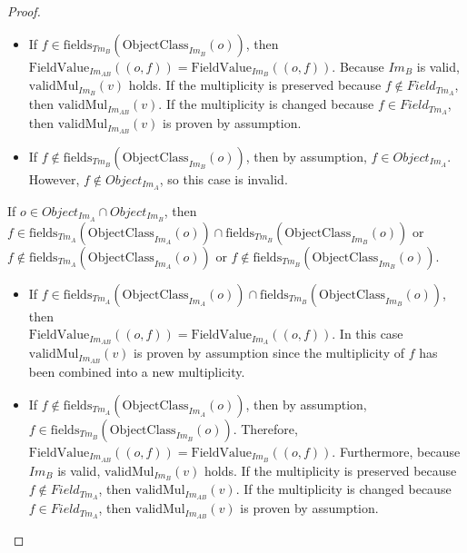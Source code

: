 \begin{proof}
\begin{itemize}
    \begin{itemize}
        \item If $f \in \mathrm{fields}_{Tm_{B}}(\mathrm{ObjectClass}_{Im_{B}}(o))$, then $\mathrm{FieldValue}_{Im_{AB}}(( o, f )) = \mathrm{FieldValue}_{Im_{B}}(( o, f ))$. Because $Im_{B}$ is valid, $\mathrm{validMul}_{Im_{B}}(v)$ holds. If the multiplicity is preserved because $f \not\in Field_{Tm_A}$, then $\mathrm{validMul}_{Im_{AB}}(v)$. If the multiplicity is changed because $f \in Field_{Tm_A}$, then $\mathrm{validMul}_{Im_{AB}}(v)$ is proven by assumption.
        
        \item If $f \not\in \mathrm{fields}_{Tm_{B}}(\mathrm{ObjectClass}_{Im_{B}}(o))$, then by assumption, $f \in Object_{Im_A}$. However, $f \not\in Object_{Im_A}$, so this case is invalid.
    \end{itemize}
    
    If $o \in Object_{Im_A} \cap Object_{Im_B}$, then \\$f \in \mathrm{fields}_{Tm_{A}}(\mathrm{ObjectClass}_{Im_{A}}(o)) \cap \mathrm{fields}_{Tm_{B}}(\mathrm{ObjectClass}_{Im_{B}}(o))$ or \\$f \not\in \mathrm{fields}_{Tm_{A}}(\mathrm{ObjectClass}_{Im_{A}}(o))$ or $f \not\in \mathrm{fields}_{Tm_{B}}(\mathrm{ObjectClass}_{Im_{B}}(o))$.
    
    \begin{itemize}
        \item If $f \in \mathrm{fields}_{Tm_{A}}(\mathrm{ObjectClass}_{Im_{A}}(o)) \cap \mathrm{fields}_{Tm_{B}}(\mathrm{ObjectClass}_{Im_{B}}(o))$, then \\$\mathrm{FieldValue}_{Im_{AB}}(( o, f )) = \mathrm{FieldValue}_{Im_{A}}(( o, f ))$. In this case $\mathrm{validMul}_{Im_{AB}}(v)$ is proven by assumption since the multiplicity of $f$ has been combined into a new multiplicity.
        
        \item If $f \not\in \mathrm{fields}_{Tm_{A}}(\mathrm{ObjectClass}_{Im_{A}}(o))$, then by assumption, $f \in \mathrm{fields}_{Tm_{B}}(\mathrm{ObjectClass}_{Im_{B}}(o))$. Therefore, $\mathrm{FieldValue}_{Im_{AB}}(( o, f )) = \mathrm{FieldValue}_{Im_{B}}(( o, f ))$. Furthermore, because $Im_{B}$ is valid, $\mathrm{validMul}_{Im_{B}}(v)$ holds. If the multiplicity is preserved because $f \not\in Field_{Tm_A}$, then $\mathrm{validMul}_{Im_{AB}}(v)$. If the multiplicity is changed because $f \in Field_{Tm_A}$, then $\mathrm{validMul}_{Im_{AB}}(v)$ is proven by assumption.
        

\end{itemize}
\end{itemize}
\end{proof}
